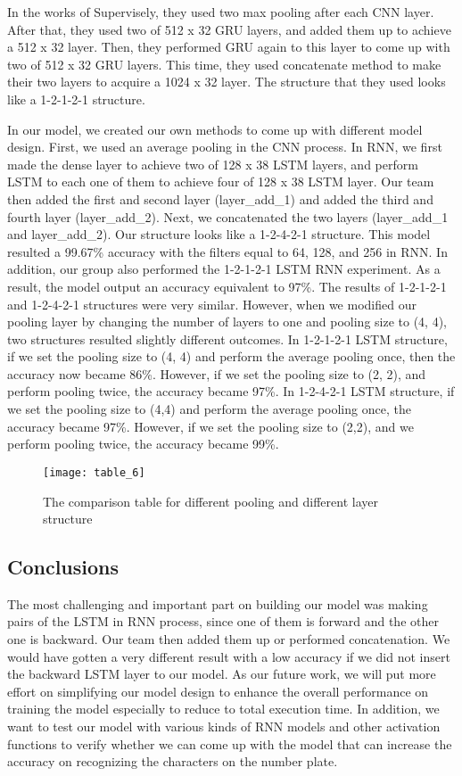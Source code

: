 \documentclass[conference]{IEEEtran}
\begin{document}
In the works of Supervisely, they used two max pooling after each CNN layer. After that, they used two of 512 x 32 GRU layers, and added them up to achieve a 512 x 32 layer. Then, they performed GRU again to this layer to come up with two of 512 x 32 GRU layers. This time, they used concatenate method to make their two layers to acquire a 1024 x 32 layer. The structure that they used looks like a 1-2-1-2-1 structure.

In our model, we created our own methods to come up with different model design. First, we used an average pooling in the CNN process. In RNN, we first made the dense layer to achieve two of 128 x 38 LSTM layers, and perform LSTM to each one of them to achieve four of 128 x 38 LSTM layer. Our team then added the first and second layer (layer\_add\_1) and added the third and fourth layer (layer\_add\_2). Next, we concatenated the two layers (layer\_add\_1 and layer\_add\_2). Our structure looks like a 1-2-4-2-1 structure. This model resulted a 99.67\% accuracy with the filters equal to 64, 128, and 256 in RNN.
In addition, our group also performed the 1-2-1-2-1 LSTM RNN experiment. As a result, the model output an accuracy equivalent to 97\%. The results of 1-2-1-2-1 and 1-2-4-2-1 structures were very similar. However, when we modified our pooling layer by changing the number of layers to one and pooling size to (4, 4), two structures resulted slightly different outcomes.
In 1-2-1-2-1 LSTM structure, if we set the pooling size to (4, 4) and perform the average pooling once, then the accuracy now became 86\%. However, if we set the pooling size to (2, 2), and perform pooling twice, the accuracy became 97\%.
In 1-2-4-2-1 LSTM structure, if we set the pooling size to (4,4) and perform the average pooling once, the accuracy became 97\%. However, if we set the pooling size to (2,2), and we perform pooling twice, the accuracy became 99\%.

\begin{figure}[H]
\centering
\texttt{[image: table\_6]}
\caption{The comparison table for different pooling and different layer structure}
\end{figure}

\subsection{Conclusions}
The most challenging and important part on building our model was making pairs of the LSTM in RNN process, since one of them is forward and the other one is backward. Our team then added them up or performed concatenation. We would have gotten a very different result with a low accuracy if we did not insert the backward LSTM layer to our model. As our future work, we will put more effort on simplifying our model design to enhance the overall performance on training the model especially to reduce to total execution time. In addition, we want to test our model with various kinds of RNN models and other activation functions to verify whether we can come up with the model that can increase the accuracy on recognizing the characters on the number plate.
\end{document}
